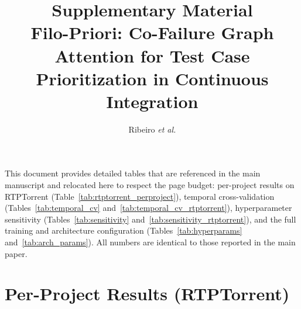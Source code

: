 \documentclass[10pt,journal,compsoc]{IEEEtran}
\begin{document}
\title{Supplementary Material\\
\large Filo-Priori: Co-Failure Graph Attention for Test Case
Prioritization in Continuous Integration}

\author{Ribeiro \MakeLowercase{\textit{et al.}}}


\maketitle

This document provides detailed tables that are referenced in the main
manuscript and relocated here to respect the page budget: per-project
results on RTPTorrent (Table~\ref{tab:rtptorrent_perproject}), temporal
cross-validation (Tables~\ref{tab:temporal_cv}
and~\ref{tab:temporal_cv_rtptorrent}), hyperparameter sensitivity
(Tables~\ref{tab:sensitivity} and~\ref{tab:sensitivity_rtptorrent}), and the
full training and architecture configuration (Tables~\ref{tab:hyperparams}
and~\ref{tab:arch_params}). All numbers are identical to those reported in
the main paper.

\section{Per-Project Results (RTPTorrent)}
\end{document}
